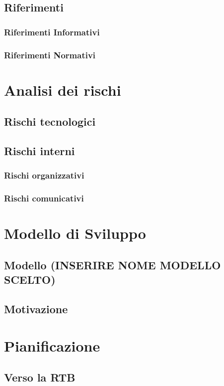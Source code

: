 \documentclass[5pt]{article}
\begin{document}
\subsection{Riferimenti}
\subsubsection{Riferimenti Informativi}
\subsubsection{Riferimenti Normativi}

\section{Analisi dei rischi}
\subsection{Rischi tecnologici}
\subsection{Rischi interni}
\subsubsection{Rischi organizzativi}
\subsubsection{Rischi comunicativi}

\section{Modello di Sviluppo}
\subsection{Modello (INSERIRE NOME MODELLO SCELTO)}
\subsection{Motivazione}

\section{Pianificazione}
\subsection{Verso la RTB}
\end{document}

